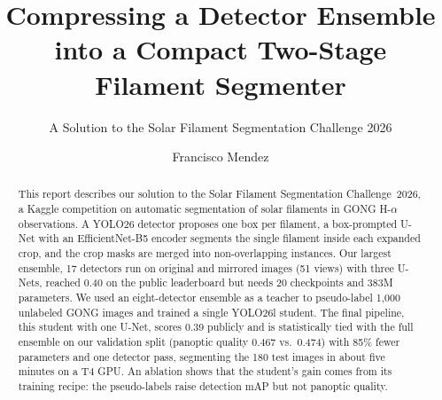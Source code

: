 \documentclass[sigconf]{acmart}
\begin{document}
\title{Compressing a Detector Ensemble into a Compact Two-Stage Filament Segmenter}  %
\subtitle{A Solution to the Solar Filament Segmentation Challenge 2026} %


\author{Francisco Mendez}


\begin{abstract}
    This report describes our solution to the Solar Filament Segmentation Challenge~2026, a Kaggle competition on automatic segmentation of solar filaments in GONG H-$\alpha$ observations. A YOLO26 detector proposes one box per filament, a box-prompted U-Net with an EfficientNet-B5 encoder segments the single filament inside each expanded crop, and the crop masks are merged into non-overlapping instances. Our largest ensemble, 17 detectors run on original and mirrored images (51 views) with three U-Nets, reached 0.40 on the public leaderboard but needs 20 checkpoints and 383M parameters. We used an eight-detector ensemble as a teacher to pseudo-label 1,000 unlabeled GONG images and trained a single YOLO26l student. The final pipeline, this student with one U-Net, scores 0.39 publicly and is statistically tied with the full ensemble on our validation split (panoptic quality 0.467 vs.\ 0.474) with 85\% fewer parameters and one detector pass, segmenting the 180 test images in about five minutes on a T4 GPU. An ablation shows that the student's gain comes from its training recipe: the pseudo-labels raise detection mAP but not panoptic quality.
\end{abstract}

\maketitle

\end{document}
